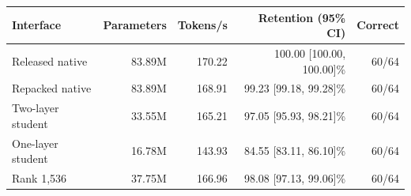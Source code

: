 \begin{tabular}{lrrrr}
\toprule
Interface & Parameters & Tokens/s & Retention (95\% CI) & Correct \\
\midrule
Released native & 83.89M & 170.22 & 100.00 [100.00, 100.00]\% & 60/64 \\
Repacked native & 83.89M & 168.91 & 99.23 [99.18, 99.28]\% & 60/64 \\
Two-layer student & 33.55M & 165.21 & 97.05 [95.93, 98.21]\% & 60/64 \\
One-layer student & 16.78M & 143.93 & 84.55 [83.11, 86.10]\% & 60/64 \\
Rank 1,536 & 37.75M & 166.96 & 98.08 [97.13, 99.06]\% & 60/64 \\
\bottomrule
\end{tabular}
